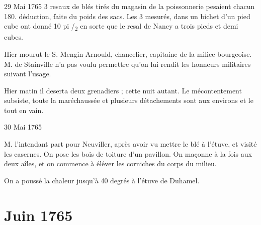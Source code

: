 \begin{diary}{29 Mai 1765}{}
                         3 resaux de blés tirés du magasin
                              de la
                              poissonnerie pesaient chacun 180. déduction, faite du poids des sacs. Les 3 mesurés,
                           dans un bichet d'un pied cube ont donné
                           10 pi /\textsubscript{2} en sorte que le
                           resal de Nancy a
                           trois pieds et demi cubes. \bigskip


                         Hier mourut le S. Mengin Arnould,
                           chancelier, capitaine de la milice
                              bourgeoise.
                           M. de Stainville n'a pas
                           voulu permettre
                           qu'on lui rendit les honneurs militaires suivant
                           l'usage. \bigskip


                         Hier matin il deserta deux
                           grenadiers ;
                           cette nuit autant. Le mécontentement subsiste,
                           toute la maréchaussée et plusieurs détachements
                           sont aux environs et le tout en vain. \bigskip


                     \end{diary}
                     \begin{diary}{30 Mai 1765}{}


                           M. l'intendant part pour
                              Neuviller, après
                           avoir vu mettre le blé à l'étuve, et visité
                           les casernes. On pose
                           les bois de toiture
                           d'un pavillon. On maçonne à la fois aux
                           deux aîles, et on commence à éléver les
                           corniches du corps du milieu. \bigskip


                         On a poussé la chaleur jusqu'à 40
                           degrés
                           à l'étuve de Duhamel.
                        \bigskip


                     \end{diary}
                  \chapter*{Juin 1765}




